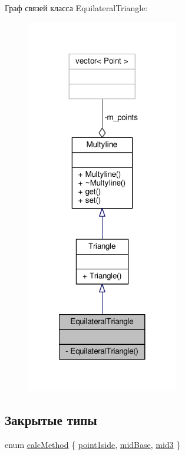 Граф связей класса Equilateral\-Triangle\-:
\nopagebreak
\begin{figure}[H]
\begin{center}
\leavevmode
\includegraphics[width=188pt]{class_equilateral_triangle__coll__graph}
\end{center}
\end{figure}
\subsection*{Закрытые типы}
\begin{DoxyCompactItemize}
\item 
enum \hyperlink{class_equilateral_triangle_a9ddc7a249c2c1cc8f4c5fabc0638f207}{calc\-Method} \{ \hyperlink{class_equilateral_triangle_a9ddc7a249c2c1cc8f4c5fabc0638f207ab22c1ea5ea1ee25fa8afd9400de5c297}{point1side}, 
\hyperlink{class_equilateral_triangle_a9ddc7a249c2c1cc8f4c5fabc0638f207a031108bfa10203230179e8ba4b5070ab}{mid\-Base}, 
\hyperlink{class_equilateral_triangle_a9ddc7a249c2c1cc8f4c5fabc0638f207a108152f513b3929e8f8923d156ee59e5}{mid3}
 \}
\end{DoxyCompactItemize}
